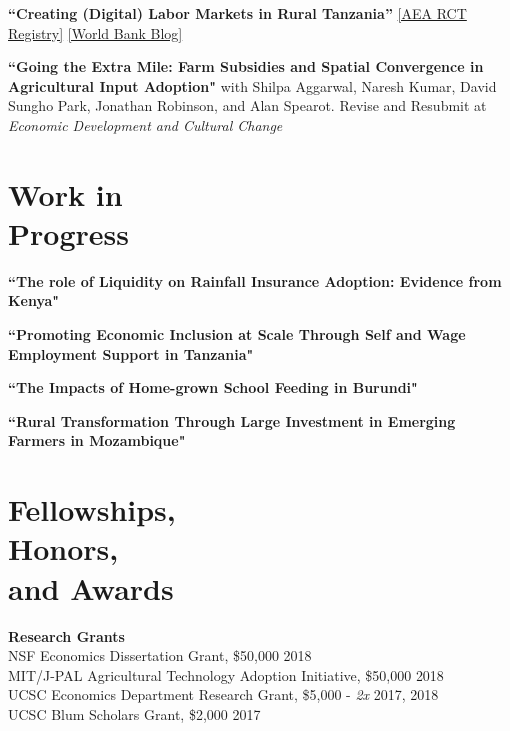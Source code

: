 \documentclass[letterpaper, margin, 10pt]{res} %
\begin{document}
\begin{resume}
{\bf ``{Creating (Digital) Labor Markets in Rural Tanzania}''} \href{https://www.socialscienceregistry.org/trials/4483}{{[AEA RCT Registry]}} \href{https://blogs.worldbank.org/impactevaluations/using-sms-transform-agricultural-labor-markets-tanzania-guest-post-dahyeon-jeong}{{[World Bank Blog]}}


{\bf ``Going the Extra Mile: Farm Subsidies and Spatial Convergence in Agricultural Input Adoption"}
with Shilpa Aggarwal, Naresh Kumar, David Sungho Park, Jonathan Robinson, and Alan Spearot. Revise and Resubmit at \textit{Economic Development and Cultural Change}


\normalsize\section{\textbf{Work in  \\ Progress}}

{\bf ``The role of Liquidity on Rainfall Insurance Adoption: Evidence from Kenya"}

{\bf ``Promoting Economic Inclusion at Scale Through Self and Wage Employment Support in Tanzania"}

{\bf ``The Impacts of Home-grown School Feeding in Burundi"}

{\bf ``Rural Transformation Through Large Investment in Emerging Farmers in Mozambique"}



\section{\sc \textbf{Fellowships, \\ Honors, \\ and Awards}}
{\bf Research Grants}\\
NSF Economics Dissertation Grant, \$50,000  \hfill{2018}\\
MIT/J-PAL Agricultural Technology Adoption Initiative, \$50,000   \hfill{2018}\\
UCSC Economics Department Research Grant, \$5,000 - \textit{2x}  \hfill{2017, 2018}\\
UCSC Blum Scholars Grant, \$2,000    \hfill{2017}


\end{resume}
\end{document}

